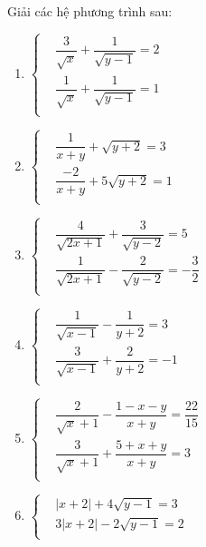 \begin{bt}
	Giải các hệ phương trình sau:
	\begin{multicols}{2}
		\begin{enumerate}
			\item  $\left\{ \begin{aligned}
			& \dfrac{3}{\sqrt{x}}+\dfrac{1}{\sqrt{y-1}}=2 \\ 
			& \dfrac{1}{\sqrt{x}}+\dfrac{1}{\sqrt{y-1}}=1 \\ 
			\end{aligned} \right.$ 
			\item $\left\{ \begin{aligned}
			& \dfrac{1}{x+y}+\sqrt{y+2}=3 \\ 
			& \dfrac{-2}{x+y}+5\sqrt{y+2}=1 \\ 
			\end{aligned} \right.$ 
			\item $\left\{ \begin{aligned}
			& \dfrac{4}{\sqrt{2x+1}}+\dfrac{3}{\sqrt{y-2}}=5 \\ 
			& \dfrac{1}{\sqrt{2x+1}}-\dfrac{2}{\sqrt{y-2}}=-\dfrac{3}{2} \\ 
			\end{aligned} \right.$   
			\item $\left\{ \begin{aligned}
			& \dfrac{1}{\sqrt{x-1}}-\dfrac{1}{y+2}=3 \\ 
			& \dfrac{3}{\sqrt{x-1}}+\dfrac{2}{y+2}=-1 \\ 
			\end{aligned} \right.$  
			\item $\left\{ \begin{aligned}
			& \dfrac{2}{\sqrt{x}+1}-\dfrac{1-x-y}{x+y}=\dfrac{22}{15} \\ 
			& \dfrac{3}{\sqrt{x}+1}+\dfrac{5+x+y}{x+y}=3 \\ 
			\end{aligned} \right.$ 
			\item $\left\{ \begin{aligned}
			& \left| x+2 \right|+4\sqrt{y-1}=3 \\ 
			& 3\left| x+2 \right|-2\sqrt{y-1}=2 \\ 
			\end{aligned} \right.$  
		\end{enumerate}
	\end{multicols}
	\loigiai{
		\begin{enumerate}
			\item 

\end{enumerate}}
\end{bt}
